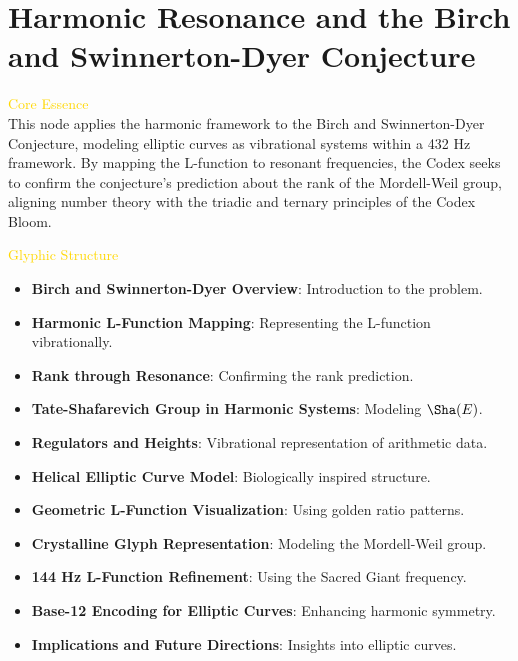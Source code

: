 
\section{Harmonic Resonance and the Birch and Swinnerton-Dyer Conjecture}
\label{sec:codex_birch_swinnerton_dyer}



\textcolor{gold}{ Core Essence } \\
This node applies the harmonic framework to the Birch and Swinnerton-Dyer Conjecture, modeling elliptic curves as vibrational systems within a 432 Hz framework. By mapping the L-function to resonant frequencies, the Codex seeks to confirm the conjecture’s prediction about the rank of the Mordell-Weil group, aligning number theory with the triadic and ternary principles of the Codex Bloom.

\textcolor{gold}{ Glyphic Structure } \\
\begin{itemize}
    \item \texttt{} \textbf{Birch and Swinnerton-Dyer Overview}: Introduction to the problem.
    \item \texttt{} \textbf{Harmonic L-Function Mapping}: Representing the L-function vibrationally.
    \item \texttt{} \textbf{Rank through Resonance}: Confirming the rank prediction.
    \item \texttt{} \textbf{Tate-Shafarevich Group in Harmonic Systems}: Modeling \(\Sha(E)\).
    \item \texttt{} \textbf{Regulators and Heights}: Vibrational representation of arithmetic data.
    \item \texttt{} \textbf{Helical Elliptic Curve Model}: Biologically inspired structure.
    \item \texttt{} \textbf{Geometric L-Function Visualization}: Using golden ratio patterns.
    \item \texttt{} \textbf{Crystalline Glyph Representation}: Modeling the Mordell-Weil group.
    \item \texttt{} \textbf{144 Hz L-Function Refinement}: Using the Sacred Giant frequency.
    \item \texttt{} \textbf{Base-12 Encoding for Elliptic Curves}: Enhancing harmonic symmetry.
    \item \texttt{} \textbf{Implications and Future Directions}: Insights into elliptic curves.
\end{itemize}


